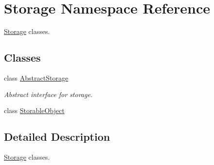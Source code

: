 \hypertarget{namespaceStorage}{
\section{Storage Namespace Reference}
\label{de/d4e/namespaceStorage}
}


\hyperlink{namespaceStorage}{Storage} classes.  


\subsection*{Classes}
\begin{DoxyCompactItemize}
\item 
class \hyperlink{classStorage_1_1AbstractStorage}{AbstractStorage}
\begin{DoxyCompactList}\small\item\em Abstract interface for storage. \item\end{DoxyCompactList}\item 
class \hyperlink{classStorage_1_1StorableObject}{StorableObject}
\end{DoxyCompactItemize}


\subsection{Detailed Description}
\hyperlink{namespaceStorage}{Storage} classes. 